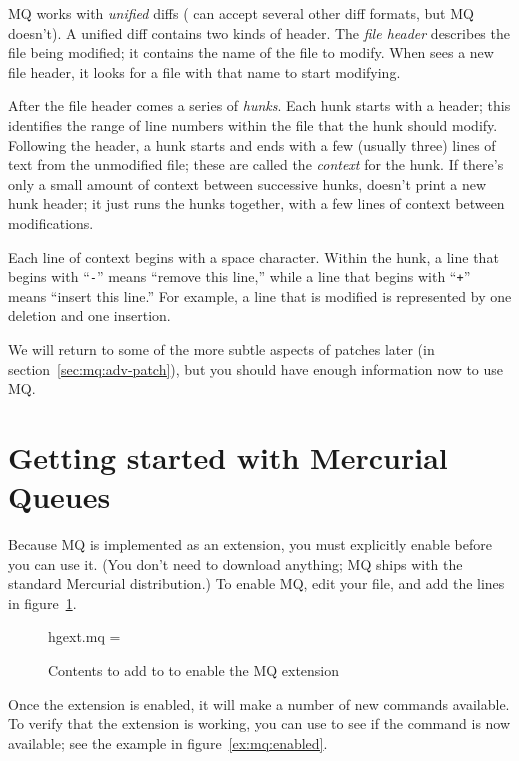 MQ works with \emph{unified} diffs ( can accept several
other diff formats, but MQ doesn't).  A unified diff contains two
kinds of header.  The \emph{file header} describes the file being
modified; it contains the name of the file to modify.  When
 sees a new file header, it looks for a file with that
name to start modifying.

After the file header comes a series of \emph{hunks}.  Each hunk
starts with a header; this identifies the range of line numbers within
the file that the hunk should modify.  Following the header, a hunk
starts and ends with a few (usually three) lines of text from the
unmodified file; these are called the \emph{context} for the hunk.  If
there's only a small amount of context between successive hunks,
 doesn't print a new hunk header; it just runs the hunks
together, with a few lines of context between modifications.

Each line of context begins with a space character.  Within the hunk,
a line that begins with ``\texttt{-}'' means ``remove this line,''
while a line that begins with ``\texttt{+}'' means ``insert this
line.''  For example, a line that is modified is represented by one
deletion and one insertion.

We will return to some of the more subtle aspects of patches later (in
section~\ref{sec:mq:adv-patch}), but you should have enough information
now to use MQ.

\section{Getting started with Mercurial Queues}
\label{sec:mq:start}

Because MQ is implemented as an extension, you must explicitly enable
before you can use it.  (You don't need to download anything; MQ ships
with the standard Mercurial distribution.)  To enable MQ, edit your
 file, and add the lines in figure~\ref{ex:mq:config}.

\begin{figure}[ht]
  \begin{codesample4}
    [extensions]
    hgext.mq =
  \end{codesample4}
  \label{ex:mq:config}
  \caption{Contents to add to  to enable the MQ extension}
\end{figure}

Once the extension is enabled, it will make a number of new commands
available.  To verify that the extension is working, you can use
 to see if the  command is now available; see
the example in figure~\ref{ex:mq:enabled}.

